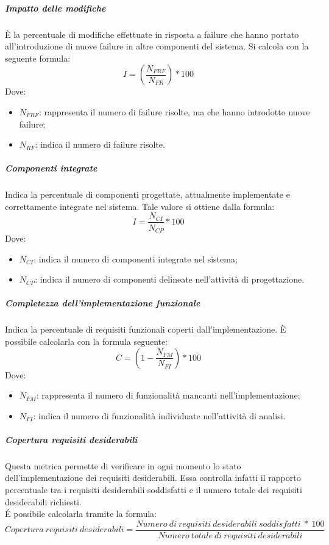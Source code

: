 \documentclass[../NormeDiProgetto_v3.0.0.tex]{subfiles}
\begin{document}
			\subparagraph{Impatto delle modifiche}
				È la percentuale di modifiche effettuate in risposta a failure che hanno portato all'introduzione di nuove failure in altre componenti del sistema. Si calcola con la seguente formula:
					\begin{equation*}
						I = (\frac{N_{FRF}}{N_{FR}}) * 100
					\end{equation*}
					Dove:
					\begin{itemize}
						\item \textbf{$	N_{FRF}$}: rappresenta il numero di failure risolte, ma che hanno introdotto nuove failure;
						\item \textbf{$N_{RF}$}: indica il numero di failure risolte.
					\end{itemize}

	     		\subparagraph{Componenti integrate}
				Indica la percentuale di componenti progettate, attualmente implementate e correttamente integrate nel sistema.
				Tale valore si ottiene dalla formula:
				\begin{equation*}
					I = \frac{N_{CI}}{N_{CP}} * 100
				\end{equation*}
				Dove:
				\begin{itemize}
					\item \textbf{$N_{CI}$}: indica il numero di componenti integrate nel sistema;
					\item \textbf{$N_{CP}$}: indica il numero di componenti delineate nell'attività di progettazione.
				\end{itemize}
				
			\subparagraph{Completezza dell'implementazione funzionale}
				Indica la percentuale di requisiti funzionali coperti dall'implementazione.
				È possibile calcolarla con la formula seguente:
				\begin{equation*}
					C = (1 - \frac{N_{FM}}{N_{FI}}) * 100
				\end{equation*}
				Dove:
				\begin{itemize}
					\item \textbf{$N_{FM}$}: rappresenta il numero di funzionalità mancanti nell'implementazione;
					 \item \textbf{$N_{FI}$}: indica il numero di funzionalità individuate nell'attività di analisi.
				\end{itemize}
 
            
            \subparagraph{Copertura requisiti desiderabili}
				Questa metrica permette di verificare in ogni momento lo stato dell'implementazione dei requisiti desiderabili. Essa controlla infatti il rapporto percentuale tra i requisiti desiderabili soddisfatti e il numero totale dei requisiti desiderabili richiesti.\\
				É possibile calcolarla tramite la formula:
				\begin{equation*}
					Copertura \ requisiti \ desiderabili = \frac{Numero \ di \ requisiti \ desiderabili \ soddisfatti \ * \ 100}{Numero \ totale \ di \ requisiti \ desiderabili}
				\end{equation*}
\end{document}
